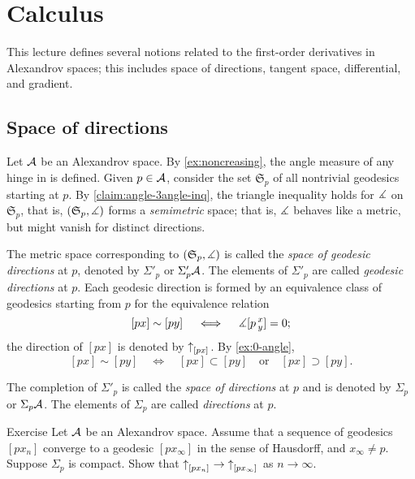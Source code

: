 
\chapter{Calculus}\label{chap:derivative}

This lecture defines several notions related to the first-order derivatives in Alexandrov spaces;
this includes space of directions, tangent space, differential, and gradient.

\section{Space of directions} 
\label{sec:space+directions}

Let $\mathcal{A}$ be an Alexandrov space.
By \ref{ex:noncreasing}, the angle measure of any hinge in is defined.
Given $p\in \mathcal{A}$, consider the set $\mathfrak{S}_p$ of all nontrivial geodesics starting at $p$.
By \ref{claim:angle-3angle-inq}, the triangle inequality holds for $\measuredangle$ on $\mathfrak{S}_p$,
that is, $(\mathfrak{S}_p,\measuredangle)$ 
forms a \emph{semimetric} space;
that is, $\measuredangle$ behaves like a metric, but might vanish for distinct directions. 

The metric space corresponding to  $(\mathfrak{S}_p,\measuredangle)$ is called the \emph{space of geodesic directions} at $p$, denoted by $\Sigma'_p$ or $\Sigma'_p\mathcal{A}$.
The elements of $\Sigma'_p$ are called \emph{geodesic directions} at $p$.
Each geodesic direction is formed by an equivalence class of geodesics starting from $p$ 
for the equivalence relation 
\[[px]\sim[py]\quad \iff\quad \measuredangle[p\,{}^{x}_{y}]=0;\]
the direction of $[px]$ is denoted by ${\uparrow}_{[{p}{x}]_{{}}} $.
By \ref{ex:0-angle}, 
\[[px]\sim[py]
\quad\iff\quad
[px]\subset [py]
\quad\text{or}\quad
[px]\supset[py].
\]
 
The completion of $\Sigma'_p$ is called the \emph{space of directions} at $p$ and is denoted by $\Sigma_p$ or $\Sigma_p\mathcal{A}$.
The elements of $\Sigma_p$ are called \emph{directions} at $p$.

\begin{thm}{Exercise}\label{ex:dir-compact}
Let $\mathcal{A}$ be an Alexandrov space.
Assume that a sequence of geodesics $[px_n]$ converge to a geodesic $[px_\infty]$ in the sense of Hausdorff,
and $x_\infty\ne p$.
Suppose $\Sigma_p$ is compact.
Show that ${\uparrow}_{[{p}{x_n}]_{{}}}\to{\uparrow}_{[{p}{x_\infty}]_{{}}}$ as $n\to\infty$.

\end{thm}


